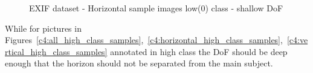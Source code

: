 \begin{figure}[h!]
    \centering  
    \caption{EXIF dataset - Horizontal sample images low(0) class - shallow DoF}
    \label{c4:vertical_low_class_samples}
\end{figure}


While for pictures in Figures~\ref{c4:all_high_class_samples},~\ref{c4:horizontal_high_class_samples},~\ref{c4:vertical_high_class_samples} annotated in high class the DoF should be deep enough that the horizon should not be separated from the main subject.

